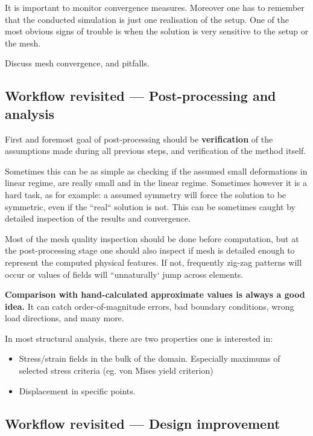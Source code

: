 \documentclass[12pt]{article}
\begin{document}
It is important to monitor convergence measures. Moreover one has to remember that the conducted simulation is just one realisation of the setup. One of the most obvious signs of trouble is when the solution is very sensitive to the setup or the mesh.

Discuss mesh convergence, and pitfalls.

\subsection{Workflow revisited --- Post-processing and analysis}
First and foremost goal of post-processing should be {\bf verification} of the assumptions made during all previous steps, and verification of the method itself.

Sometimes this can be as simple as checking if the assumed small deformations in linear regime, are really small and in the linear regime. Sometimes however it is a hard task, as for example: a assumed symmetry will force the solution to be symmetric, even if the ``real`` solution is not. This can be sometimes caught by detailed inspection of the results and convergence.

Most of the mesh quality inspection should be done before computation, but at the post-processing stage one should also inspect if mesh is detailed enough to represent the computed physical features. If not, frequently zig-zag patterns will occur or values of fields will ``unnaturally` jump across elements.

{\bf Comparison with hand-calculated approximate values is always a good idea.} It can catch order-of-magnitude errors, bad boundary conditions, wrong load directions, and many more.

\begin{center}\end{center}

In most structural analysis, there are two properties one is interested in:
\begin{itemize}
    \item Stress/strain fields in the bulk of the domain. Especially maximums of selected stress criteria (eg. von Mises yield criterion)
    \item Displacement in specific points.
\end{itemize}

\subsection{Workflow revisited --- Design improvement}
\end{document}
